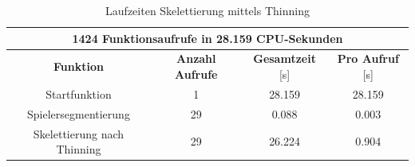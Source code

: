 \begin{table}[htbp]
\begin{center}
\begin{tabular}{|c|c|c|c|}
 \hline
  \multicolumn{4}{|c|}{1424 Funktionsaufrufe in 28.159 CPU-Sekunden} \\
  \hline
\hline 
\textbf{Funktion} & \textbf{Anzahl Aufrufe} & \textbf{Gesamtzeit} [s] & \textbf{Pro Aufruf} [s]\\
\hline Startfunktion & 1 & 28.159 & 28.159 \\ 
\hline Spielersegmentierung & 29 & 0.088 & 0.003  \\ 
\hline Skelettierung nach Thinning & 29 & 26.224 & 0.904    \\ 
\hline 
\end{tabular} 
\end{center}
\caption{Laufzeiten Skelettierung mittels Thinning}
\label{tab:laufzeiten_thinning}
\end{table}
\newpage
